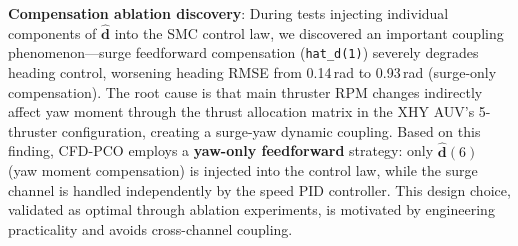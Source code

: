 \textbf{Compensation ablation discovery}: During tests injecting individual components of $\hat{\bm{d}}$ into the SMC control law, we discovered an important coupling phenomenon---surge feedforward compensation (\texttt{hat\_d(1)}) severely degrades heading control, worsening heading RMSE from 0.14\,rad to 0.93\,rad (surge-only compensation). The root cause is that main thruster RPM changes indirectly affect yaw moment through the thrust allocation matrix in the XHY AUV's 5-thruster configuration, creating a surge-yaw dynamic coupling. Based on this finding, CFD-PCO employs a \textbf{yaw-only feedforward} strategy: only $\hat{\bm{d}}(6)$ (yaw moment compensation) is injected into the control law, while the surge channel is handled independently by the speed PID controller. This design choice, validated as optimal through ablation experiments, is motivated by engineering practicality and avoids cross-channel coupling.
